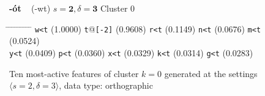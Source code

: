 \begin{figure}[t] 
\begin{mdframed}
{\LARGE \textbf{-\'{o}t}} {\large\,\,\, (-wt)} \hfill \large{$s=\textbf{2}, \delta=\textbf{3}$} \hfill Cluster 0\\
\vspace{-10pt}
\vspace{3pt}
\begin{normalsize}
\begin{tabbing}
\hspace{6ex} \= \hspace{9.5ex} \= \hspace{6ex} \= \hspace{9.5ex} \= \hspace{6ex} \= \hspace{9.5ex} \= \hspace{6ex} \= \hspace{9.5ex} \= \hspace{5ex} \= \hspace{9ex} \kill
\texttt{w<t} \> (1.0000) \> \texttt{t}@\texttt{[-2]} \> (0.9608) \> \texttt{r<t} \> (0.1149) \> \texttt{n<t} \> (0.0676) \> \texttt{m<t} \> (0.0524) \\
\texttt{y<t} \> (0.0409) \> \texttt{p<t} \> (0.0360) \> \texttt{x<t} \> (0.0329) \> \texttt{k<t} \> (0.0314) \> \texttt{g<t} \> (0.0283)
\end{tabbing}
\label{fig:cluster-0-2-3-O}
\caption{Ten most-active features of cluster $k = 0$ generated at the settings $\langle{s}=2,\delta=3\rangle$, data type: orthographic}
\end{normalsize}
\end{mdframed}
\end{figure}

